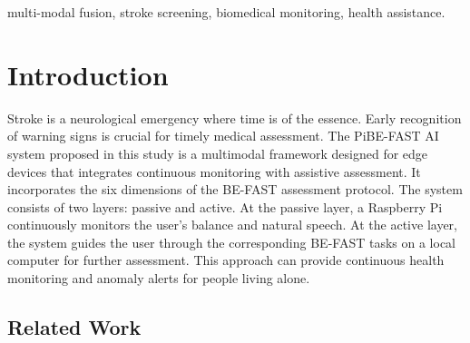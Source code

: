 \documentclass[conference]{IEEEtran}
\begin{document}
\begin{abstract}
Current AI agents are reactive. Users must manually input data, audio, and video, yet they frequently overlook or fail to recognize early warning signs, delaying critical intervention. We propose a paradigm shift toward Proactive Embodied AI. Using stroke as the case study, this paper proposes an AI fusion system named PiBE-FAST, because it covers the six BE-FAST detection dimensions: Balance, Eyes, Face, Arm, Speech, and Time, and it runs on a Raspberry Pi. The core innovation lies in equipping edge devices with monitoring capabilities, enabling a complete workflow from detecting abnormal signs to initiating guided assessment. The system employs a two-tier edge deployment architecture combining a Raspberry Pi with a local computer. It integrates screening, auditory, and warning functions and supports diverse inputs, such as images and audio. To validate feasibility, test scenarios covering simulated abnormalities, natural use, and continuous operation are designed to evaluate the system's overall performance in abnormal sign detection throughout the workflow.
\end{abstract}

\begin{IEEEkeywords}

multi-modal fusion, stroke screening, biomedical monitoring, health assistance.

\end{IEEEkeywords}

\section{Introduction}
Stroke is a neurological emergency where time is of the essence\cite{b1}. Early recognition of warning signs is crucial
for timely medical assessment. The PiBE-FAST AI system proposed in this study is a multimodal framework designed for edge devices that integrates continuous monitoring with assistive assessment. It incorporates the six dimensions of the BE-FAST assessment protocol\cite{b2}.
The system consists of two layers: passive and active. At the passive layer, a Raspberry Pi continuously monitors the user’s balance and natural speech. At the active layer, the system guides the user through the corresponding BE-FAST tasks on a local computer for further assessment.
This approach can provide continuous health monitoring and anomaly alerts for people living alone.

\subsection{Related Work}
\end{document}
